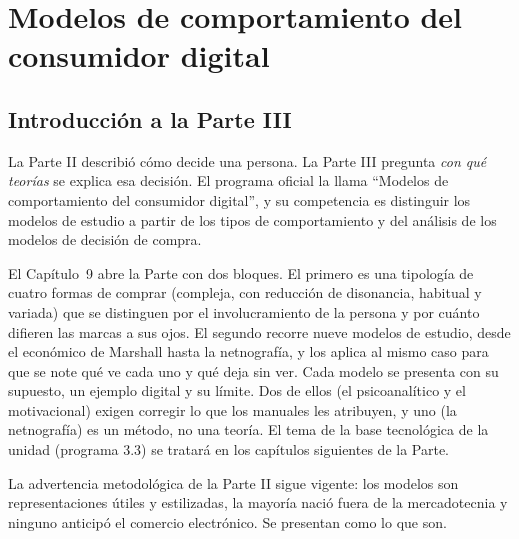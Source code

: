 \part{Modelos de comportamiento del consumidor digital}

\chapter*{Introducción a la Parte III}

La Parte II describió cómo decide una persona. La Parte III pregunta
\emph{con qué teorías} se explica esa decisión. El programa oficial la
llama \enquote{Modelos de comportamiento del consumidor digital}, y su
competencia es distinguir los modelos de estudio a partir de los tipos de
comportamiento y del análisis de los modelos de decisión de compra.

El Capítulo~9 abre la Parte con dos bloques. El primero es una tipología de
cuatro formas de comprar (compleja, con reducción de disonancia, habitual y
variada) que se distinguen por el involucramiento de la persona y por cuánto
difieren las marcas a sus ojos. El segundo recorre nueve modelos de estudio, desde
el económico de Marshall hasta la netnografía, y los aplica al mismo caso para
que se note qué ve cada uno y qué deja sin ver. Cada modelo se presenta con su
supuesto, un ejemplo digital y su límite. Dos de ellos (el psicoanalítico y el
motivacional) exigen corregir lo que los manuales les atribuyen, y uno (la
netnografía) es un método, no una teoría. El tema de la base tecnológica de la
unidad (programa 3.3) se tratará en los capítulos siguientes de la Parte.

La advertencia metodológica de la Parte II sigue vigente: los modelos son
representaciones útiles y estilizadas, la mayoría nació fuera de la
mercadotecnia y ninguno anticipó el comercio electrónico. Se presentan como
lo que son.
